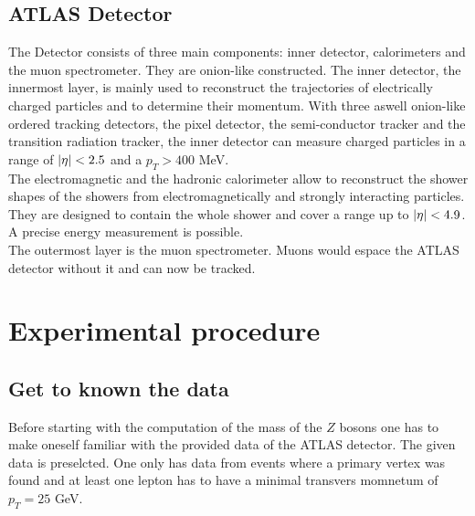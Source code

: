 \documentclass[12pt, a4paper, bibliography=totoc]{scrreprt}
\begin{document}
\section{ATLAS Detector}
The Detector consists of three main components: inner detector, calorimeters and the muon spectrometer.
They are onion-like constructed. 
The inner detector, the innermost layer, is mainly used to reconstruct the trajectories of electrically charged particles and to determine their momentum. 
With three aswell onion-like ordered tracking detectors, the pixel detector, the semi-conductor tracker and the transition radiation tracker, the inner detector can measure charged particles in a range of $\abs{\eta} < 2.5$ and a $p_{T} > 400$ \si{MeV}.\\

The electromagnetic and the hadronic calorimeter allow to reconstruct the shower shapes of the showers from electromagnetically and strongly interacting particles. 
They are designed to contain the whole shower and cover a range up to $\abs{\eta} < 4.9$. 
A precise energy measurement is possible.\\

The outermost layer is the muon spectrometer.
Muons would espace the ATLAS detector without it and can now be tracked. 


\chapter{Experimental procedure}

\section{Get to known the data}
Before starting with the computation of the mass of the $Z$ bosons one has to make oneself familiar with the provided data of the ATLAS detector. 
The given data is preselcted. 
One only has data from events where a primary vertex was found and at least one lepton has to have a minimal transvers momnetum of $p_{T} = 25$ \si{GeV}.
\end{document}
